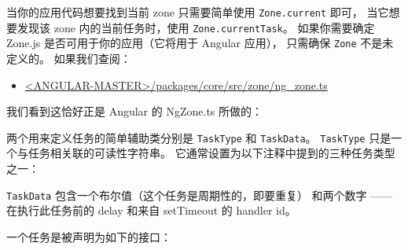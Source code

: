 
当你的应用代码想要找到当前 zone 只需要简单使用 \texttt{Zone.current} 即可，
当它想要发现该 zone 内的当前任务时，使用 \texttt{Zone.currentTask}。
如果你需要确定 Zone.js 是否可用于你的应用（它将用于 Angular 应用），
只需确保 \texttt{Zone} 不是未定义的。
如果我们查阅：

\begin{itemize}
  \item \href{https://github.com/angular/angular/blob/master/packages/core/src/zone/ng_zone.ts}
        {<ANGULAR-MASTER>/packages/core/src/zone/ng\_zone.ts}
\end{itemize}


我们看到这恰好正是 Angular 的 NgZone.ts 所做的：




两个用来定义任务的简单辅助类分别是 \texttt{TaskType} 和 \texttt{TaskData}。
\texttt{TaskType} 只是一个与任务相关联的可读性字符串。
它通常设置为以下注释中提到的三种任务类型之一：




\texttt{TaskData} 包含一个布尔值（这个任务是周期性的，即要重复）
和两个数字 —— 在执行此任务前的 delay 和来自 setTimeout 的 handler id。




一个任务是被声明为如下的接口：

